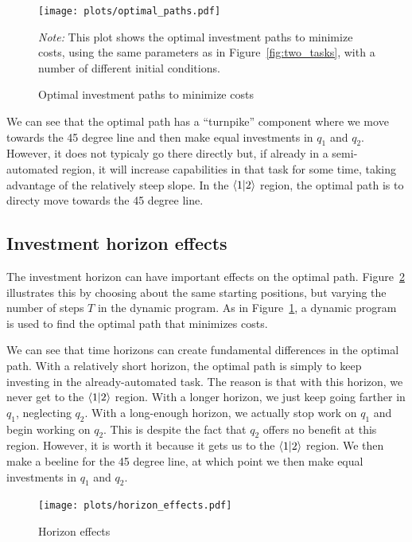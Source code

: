 \documentclass{article}
\theoremstyle{plain}
\theoremstyle{plain}
\begin{document}
\begin{figure}
  \begin{center}
  \caption{Optimal investment paths to minimize costs} \label{fig:optimal_paths}
  \label{fig:optimal_paths} 
  \texttt{[image: plots/optimal\_paths.pdf]}
  \end{center}
  \begin{footnotesize}
  \emph{Note:} This plot shows the optimal investment paths to minimize costs, using the same parameters as in Figure~\ref{fig:two_tasks}, with a number of different initial conditions.
\end{footnotesize}
\end{figure}

We can see that the optimal path has a ``turnpike'' component where we move towards the 45 degree line and then make equal investments in $q_1$ and $q_2$.
However, it does not typicaly go there directly but, if already in a semi-automated region, it will increase capabilities in that task for some time, taking advantage of the relatively steep slope. 
In the $\langle 1|2 \rangle$ region, the optimal path is to directy move towards the 45 degree line.

\subsection{Investment horizon effects}
The investment horizon can have important effects on the optimal path.
Figure~\ref{fig:horizon_effects} illustrates this by choosing about the same starting positions, but varying the number of steps $T$ in the dynamic program.
As in Figure~\ref{fig:optimal_paths}, a dynamic program is used to find the optimal path that minimizes costs.

We can see that time horizons can create fundamental differences in the optimal path.
With a relatively short horizon, the optimal path is simply to keep investing in the already-automated task.
The reason is that with this horizon, we never get to the $\langle 1|2 \rangle$ region.
With a longer horizon, we just keep going farther in $q_1$, neglecting $q_2$.
With a long-enough horizon, we actually stop work on $q_1$ and begin working on $q_2$.
This is despite the fact that $q_2$ offers no benefit at this region.
However, it is worth it because it gets us to the $\langle 1|2 \rangle$ region.
We then make a beeline for the 45 degree line, at which point we then make equal investments in $q_1$ and $q_2$.

\begin{figure}
  \begin{center}
  \caption{Horizon effects} \label{fig:horizon_effects}
  \texttt{[image: plots/horizon\_effects.pdf]}
  \end{center}
\end{figure}
\end{document}
